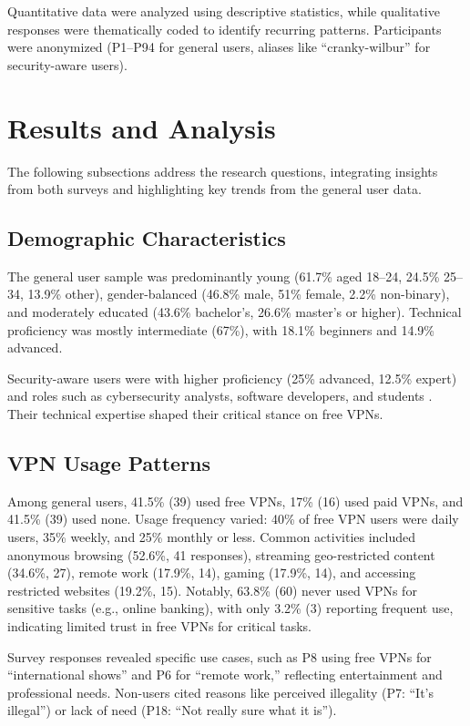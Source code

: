 \documentclass[11pt,a4paper]{article}
\begin{document}
Quantitative data were analyzed using descriptive statistics, while qualitative responses were thematically coded to identify recurring patterns. Participants were anonymized (P1--P94 for general users, aliases like ``cranky-wilbur'' for security-aware users).

\section{Results and Analysis}
The following subsections address the research questions, integrating insights from both surveys and highlighting key trends from the general user data.

\subsection{Demographic Characteristics}
The general user sample was predominantly young (61.7\% aged 18--24, 24.5\% 25--34, 13.9\% other), gender-balanced (46.8\% male, 51\% female, 2.2\% non-binary), and moderately educated (43.6\% bachelor’s, 26.6\% master’s or higher). Technical proficiency was mostly intermediate (67\%), with 18.1\% beginners and 14.9\% advanced.

Security-aware users were with higher proficiency (25\% advanced, 12.5\% expert) and roles such as cybersecurity analysts, software developers, and students \citep{Shetty2025}. Their technical expertise shaped their critical stance on free VPNs.

\subsection{VPN Usage Patterns}
Among general users, 41.5\% (39) used free VPNs, 17\% (16) used paid VPNs, and 41.5\% (39) used none. Usage frequency varied: 40\% of free VPN users were daily users, 35\% weekly, and 25\% monthly or less. Common activities included anonymous browsing (52.6\%, 41 responses), streaming geo-restricted content (34.6\%, 27), remote work (17.9\%, 14), gaming (17.9\%, 14), and accessing restricted websites (19.2\%, 15). Notably, 63.8\% (60) never used VPNs for sensitive tasks (e.g., online banking), with only 3.2\% (3) reporting frequent use, indicating limited trust in free VPNs for critical tasks.

Survey responses revealed specific use cases, such as P8 using free VPNs for ``international shows'' and P6 for ``remote work,'' reflecting entertainment and professional needs. Non-users cited reasons like perceived illegality (P7: ``It’s illegal'') or lack of need (P18: ``Not really sure what it is'').
\end{document}
